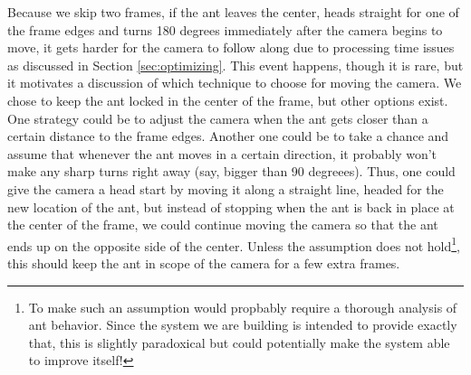 
Because we skip two frames, if the ant leaves the center, heads straight for one of the frame edges and turns 180 degrees immediately after the camera begins to move, it gets harder for the camera to follow along due to processing time issues as discussed in Section \ref{sec:optimizing}. This event happens, though it is rare, but it motivates a discussion of which technique to choose for moving the camera. We chose to keep the ant locked in the center of the frame, but other options exist. One strategy could be to adjust the camera when the ant gets closer than a certain distance to the frame edges. Another one could be to take a chance and assume that whenever the ant moves in a certain direction, it probably won't make any sharp turns right away (say, bigger than 90 degreees). Thus, one could give the camera a head start by moving it along a straight line, headed for the new location of the ant, but instead of stopping when the ant is back in place at the center of the frame, we could continue moving the camera so that the ant ends up on the opposite side of the center. Unless the assumption does not hold\footnote{To make such an assumption would propbably require a thorough analysis of ant behavior. Since the system we are building is intended to provide exactly that, this is slightly paradoxical but could potentially make the system able to improve itself!}, this should keep the ant in scope of the camera for a few extra frames. \\


